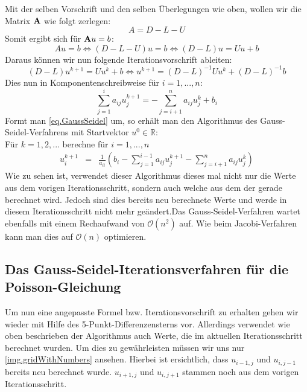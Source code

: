 Mit der selben Vorschrift und den selben Überlegungen wie oben, wollen wir die Matrix ${\textbf{A}}$ wie folgt zerlegen:
\begin{equation}
A = D - L - U
\end{equation}
Somit ergibt sich für ${\textbf{A}}u = b$:
\begin{equation}
Au = b \Leftrightarrow (D-L-U)u = b \Leftrightarrow (D-L)u = Uu + b
\end{equation}
Daraus können wir nun folgende Iterationsvorschrift ableiten:
\begin{equation}
(D-L)u^{k+1} = Uu^{k} + b \Leftrightarrow u^{k+1} = (D-L)^{-1}Uu^{k} + (D-L)^{-1}b
\end{equation}
Dies nun in Komponentenschreibweise für $i=1,...,n$:
\begin{equation}
\sum\limits_{j=1}^{i} a_{ij}u_{j}^{k+1} = -\sum\limits_{j=i+1}^{n} a_{ij}u_{j}^{k} + b_{i}\label{eq.GaussSeidel}
\end{equation}
Formt man \autoref{eq.GaussSeidel} um, so erhält man den Algorithmus des Gauss-Seidel-Verfahrens mit Startvektor $u^{0} \in \mathbb{R}$: \\
Für $k = 1,2,...$ berechne für $i = 1,...,n$
\begin{eqnarray}
u_{i}^{k+1} &=& \frac {1} {a_{ii}} (b_{i} - \sum\limits_{j=1}^{i-1} a_{ij}u_{j}^{k+1} - \sum\limits_{j=i+1}^{n} a_{ij}u_{j}^{k})
\end{eqnarray}
Wie zu sehen ist, verwendet dieser Algorithmus dieses mal nicht nur die Werte aus dem vorigen Iterationsschritt, sondern auch welche aus dem der gerade berechnet wird. Jedoch sind dies bereits neu berechnete Werte und werde in diesem Iterationsschritt nicht mehr geändert.Das Gauss-Seidel-Verfahren wartet ebenfalls mit einem Rechaufwand von $\mathcal{O}(n^{2})$ auf. Wie beim Jacobi-Verfahren kann man dies auf $\mathcal{O}(n)$ optimieren.

\subsection{Das Gauss-Seidel-Iterationsverfahren für die Poisson-Gleichung}

Um nun eine angepasste Formel bzw. Iterationsvorschrift zu erhalten gehen wir wieder mit Hilfe des 5-Punkt-Differenzensterns vor. Allerdings verwendet wie oben beschrieben der Algorithmus auch Werte, die im aktuellen Iterationsschritt berechnet wurden. Um dies zu gewährleisten müssen wir uns nur \autoref{img.gridWithNumbers} ansehen. Hierbei ist ersichtlich, dass $u_{i-1,j}$ und $u_{i,j-1}$ bereits neu berechnet wurde. $u_{i+1,j}$ und $u_{i,j+1}$ stammen noch aus dem vorigen Iterationsschritt.

